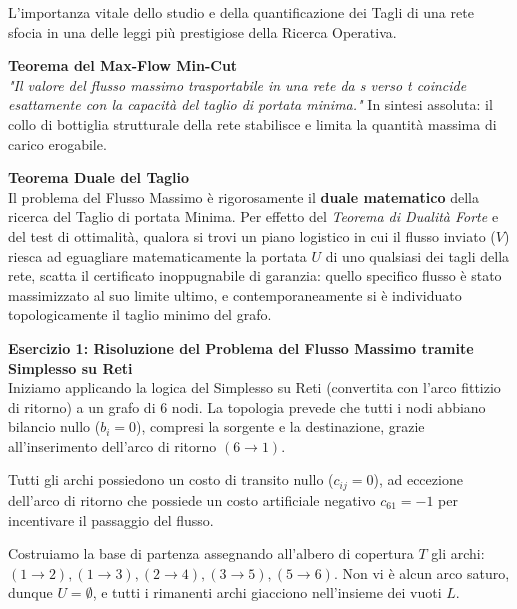 \documentclass[12pt, a4paper]{article}
\newcommand{\separatore}{\noindent{\color{titlecolor!50}\rule{\textwidth}{0.6pt}}}
\begin{document}
	L'importanza vitale dello studio e della quantificazione dei Tagli di una rete sfocia in una delle leggi più prestigiose della Ricerca Operativa.
	
	\textbf{Teorema del Max-Flow Min-Cut}\\
	\textit{"Il valore del flusso massimo trasportabile in una rete da s verso t coincide esattamente con la capacità del taglio di portata minima."}
	In sintesi assoluta: il collo di bottiglia strutturale della rete stabilisce e limita la quantità massima di carico erogabile. 
	
	\textbf{Teorema Duale del Taglio}\\
	Il problema del Flusso Massimo è rigorosamente il \textbf{duale matematico} della ricerca del Taglio di portata Minima. Per effetto del \textit{Teorema di Dualità Forte} e del test di ottimalità, qualora si trovi un piano logistico in cui il flusso inviato ($V$) riesca ad eguagliare matematicamente la portata $U$ di uno qualsiasi dei tagli della rete, scatta il certificato inoppugnabile di garanzia: quello specifico flusso è stato massimizzato al suo limite ultimo, e contemporaneamente si è individuato topologicamente il taglio minimo del grafo.
	
	\vspace{0.6cm}
	\separatore
	\vspace{0.4cm}
	
	\textbf{Esercizio 1: Risoluzione del Problema del Flusso Massimo tramite Simplesso su Reti}\\
	Iniziamo applicando la logica del Simplesso su Reti (convertita con l'arco fittizio di ritorno) a un grafo di 6 nodi. La topologia prevede che tutti i nodi abbiano bilancio nullo ($b_i = 0$), compresi la sorgente e la destinazione, grazie all'inserimento dell'arco di ritorno $(6\to1)$.

	Tutti gli archi possiedono un costo di transito nullo ($c_{ij} = 0$), ad eccezione dell'arco di ritorno che possiede un costo artificiale negativo $c_{61} = -1$ per incentivare il passaggio del flusso.
	
	Costruiamo la base di partenza assegnando all'albero di copertura $T$ gli archi: $(1\to2), (1\to3), (2\to4), (3\to5), (5\to6)$. Non vi è alcun arco saturo, dunque $U = \emptyset$, e tutti i rimanenti archi giacciono nell'insieme dei vuoti $L$.
	
\end{document}
